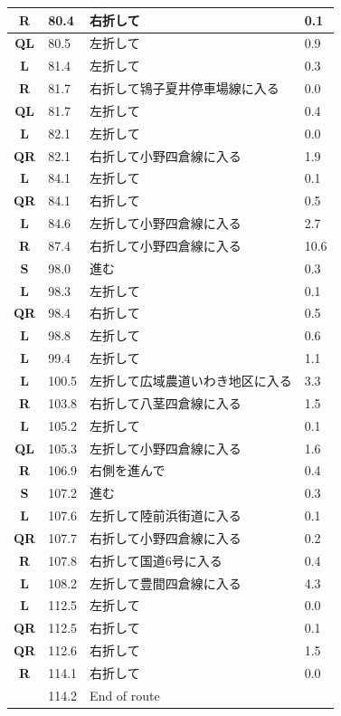 \documentclass[11pt]{article}
\begin{document}
\begin{center}
\begin{supertabular}{|c|p{0.30in}|p{2.25in}|l|}
 \textbf{R} &  80.4 & 右折して &   0.1 \\ \hline
 \textbf{QL} &  80.5 & 左折して &   0.9 \\ \hline
 \textbf{L} &  81.4 & 左折して &   0.3 \\ \hline
{} \textbf{R} &  81.7 & 右折して鴇子夏井停車場線に入る &   0.0 \\ \hline
 \textbf{QL} &  81.7 & 左折して &   0.4 \\ \hline
 \textbf{L} &  82.1 & 左折して &   0.0 \\ \hline
{} \textbf{QR} &  82.1 & 右折して小野四倉線に入る &   1.9 \\ \hline
 \textbf{L} &  84.1 & 左折して &   0.1 \\ \hline
{} \textbf{QR} &  84.1 & 右折して &   0.5 \\ \hline
 \textbf{L} &  84.6 & 左折して小野四倉線に入る &   2.7 \\ \hline
{} \textbf{R} &  87.4 & 右折して小野四倉線に入る &  10.6 \\ \hline
 \textbf{S} &  98.0 & 進む &   0.3 \\ \hline
 \textbf{L} &  98.3 & 左折して &   0.1 \\ \hline
{} \textbf{QR} &  98.4 & 右折して &   0.5 \\ \hline
 \textbf{L} &  98.8 & 左折して &   0.6 \\ \hline
 \textbf{L} &  99.4 & 左折して &   1.1 \\ \hline
 \textbf{L} & 100.5 & 左折して広域農道いわき地区に入る &   3.3 \\ \hline
{} \textbf{R} & 103.8 & 右折して八茎四倉線に入る &   1.5 \\ \hline
 \textbf{L} & 105.2 & 左折して &   0.1 \\ \hline
 \textbf{QL} & 105.3 & 左折して小野四倉線に入る &   1.6 \\ \hline
{} \textbf{R} & 106.9 & 右側を進んで &   0.4 \\ \hline
 \textbf{S} & 107.2 & 進む &   0.3 \\ \hline
 \textbf{L} & 107.6 & 左折して陸前浜街道に入る &   0.1 \\ \hline
{} \textbf{QR} & 107.7 & 右折して小野四倉線に入る &   0.2 \\ \hline
{} \textbf{R} & 107.8 & 右折して国道6号に入る &   0.4 \\ \hline
 \textbf{L} & 108.2 & 左折して豊間四倉線に入る &   4.3 \\ \hline
 \textbf{L} & 112.5 & 左折して &   0.0 \\ \hline
{} \textbf{QR} & 112.5 & 右折して &   0.1 \\ \hline
{} \textbf{QR} & 112.6 & 右折して &   1.5 \\ \hline
{} \textbf{R} & 114.1 & 右折して &   0.0 \\ \hline
{} \textbf{} & 114.2 & End of route &  \\ \hline


\end{supertabular}
\end{center}
\end{document}
